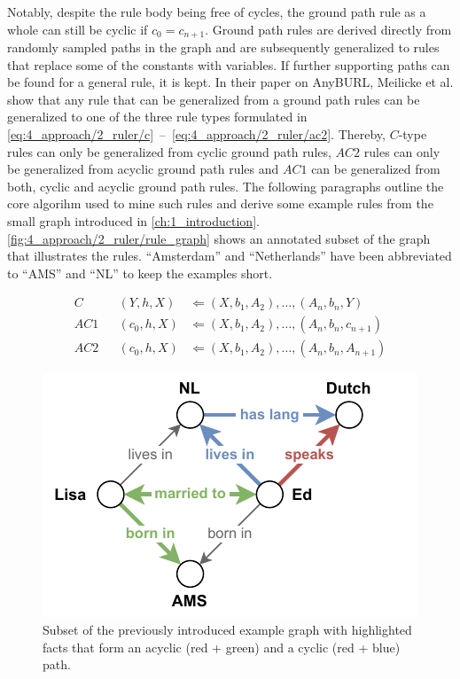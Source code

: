 Notably, despite the rule body being free of cycles, the ground path rule as a whole can still be cyclic if $c_0 = c_{n+1}$. Ground path rules are derived directly from randomly sampled paths in the graph and are subsequently generalized to rules that replace some of the constants with variables. If further supporting paths can be found for a general rule, it is kept. In their paper on AnyBURL, Meilicke et al. show that any rule that can be generalized from a ground path rules can be generalized to one of the three rule types formulated in \autoref{eq:4_approach/2_ruler/c}~--~\ref{eq:4_approach/2_ruler/ac2}. Thereby, $C$-type rules can only be generalized from cyclic ground path rules, $AC2$ rules can only be generalized from acyclic ground path rules and $AC1$ can be generalized from both, cyclic and acyclic ground path rules. The following paragraphs outline the core algorihm used to mine such rules and derive some example rules from the small graph introduced in \autoref{ch:1_introduction}. \autoref{fig:4_approach/2_ruler/rule_graph} shows an annotated subset of the graph that illustrates the rules. ``Amsterdam'' and ``Netherlands'' have been abbreviated to ``AMS'' and ``NL'' to keep the examples short.

\begin{align}
    C   && (Y, h, X)   &\Leftarrow (X, b_1, A_2), \dots, (A_n, b_n, Y)
    \label{eq:4_approach/2_ruler/c} \\
    AC1 && (c_0, h, X) &\Leftarrow (X, b_1, A_2), \dots, (A_n, b_n, c_{n+1})
    \label{eq:4_approach/2_ruler/ac1} \\
    AC2 && (c_0, h, X) &\Leftarrow (X, b_1, A_2), \dots, (A_n, b_n, A_{n+1})
    \label{eq:4_approach/2_ruler/ac2}
\end{align}

\begin{figure}[t]
    \centering
    \includegraphics{4_approach/2_ruler/rule_graph}
    \caption{Subset of the previously introduced example graph with highlighted facts that form an acyclic (red + green) and a cyclic (red + blue) path.}
    \label{fig:4_approach/2_ruler/rule_graph}
\end{figure}

